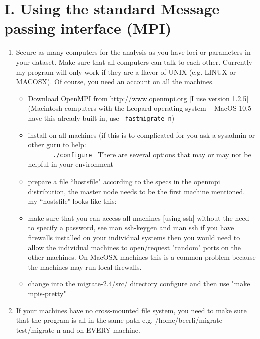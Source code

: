 \section{I. Using the standard Message passing interface (MPI)}

\begin{enumerate}
\item  Secure as many computers for the analysis as you have loci or parameters
    in your dataset. Make sure that all computers can talk to each
    other. Currently my program will only work if they are a flavor of 
    UNIX (e.g. LINUX or MACOSX). Of course, you need an account on all 
    the machines.
  \begin{itemize}
  \item   Download OpenMPI from  http://www.openmpi.org [I use version 1.2.5] (Macintosh computers with the Leopard operating system -- MacOS 10.5 have this already built-in, use \texttt{ fastmigrate-n})
    \item install on all machines (if this is to complicated for you ask a
      sysadmin or other guru to help:\\
      ~~~~~~\texttt{ ./configure }
      There are several options that may or may not be helpful in your environment
     \item prepare a file ``hostsfile" according to the specs in the openmpi distribution, the master node
      needs to be the first machine mentioned.
      my ``hostsfile" looks like this:\\
\item make sure that you can access all machines [using ssh]
     without the need to specify a password, see man ssh-keygen and man ssh
     if you have firewalls installed on your individual systems then you would need to allow
     the individual machines to open/request "random" ports on the other machines. 
     On MacOSX machines this is a common problem because the machines may run local firewalls.
\item change into the migrate-2.4/src/ directory
      configure and then use "make mpis-pretty" 
\end{itemize}      

\item If your machines have no cross-mounted file system,
    you need to make sure that the program is all
    in the same path e.g. /home/beerli/migrate-test/migrate-n and on EVERY machine.
    

\end{enumerate}
